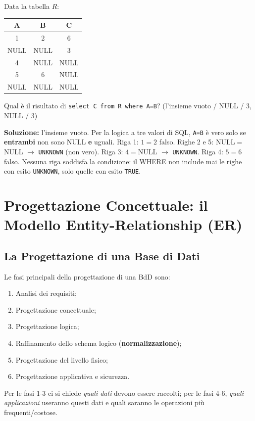 \documentclass[12pt, a4paper]{article}
\begin{document}
\begin{tcolorbox}[colback=lightergray!10, colframe=tocsec, title=\textbf{Esercizio 3}]
Data la tabella $R$:
\begin{center}
\begin{tabular}{ccc}
\toprule
A & B & C \\
\midrule
1 & 2 & 6 \\
NULL & NULL & 3 \\
4 & NULL & NULL \\
5 & 6 & NULL \\
NULL & NULL & NULL \\
\bottomrule
\end{tabular}
\end{center}
Qual è il risultato di \texttt{select C from R where A=B}? (l'insieme vuoto / NULL / 3, NULL / 3)
\end{tcolorbox}
\textbf{Soluzione:} l'insieme vuoto. Per la logica a tre valori di SQL, \texttt{A=B} è vero solo se \textbf{entrambi} non sono NULL \textbf{e} uguali. Riga 1: $1=2$ falso. Righe 2 e 5: NULL$=$NULL $\to$ \texttt{UNKNOWN} (non vero). Riga 3: $4=$NULL $\to$ \texttt{UNKNOWN}. Riga 4: $5=6$ falso. Nessuna riga soddisfa la condizione: il WHERE non include mai le righe con esito \texttt{UNKNOWN}, solo quelle con esito \texttt{TRUE}.




\section{Progettazione Concettuale: il Modello Entity-Relationship (ER)}

\subsection{La Progettazione di una Base di Dati}

Le fasi principali della progettazione di una BdD sono:
\begin{enumerate}
    \item Analisi dei requisiti;
    \item Progettazione concettuale;
    \item Progettazione logica;
    \item Raffinamento dello schema logico (\textbf{normalizzazione});
    \item Progettazione del livello fisico;
    \item Progettazione applicativa e sicurezza.
\end{enumerate}
Per le fasi 1-3 ci si chiede \textit{quali dati} devono essere raccolti; per le fasi 4-6, \textit{quali applicazioni} useranno questi dati e quali saranno le operazioni più frequenti/costose.
\end{document}
